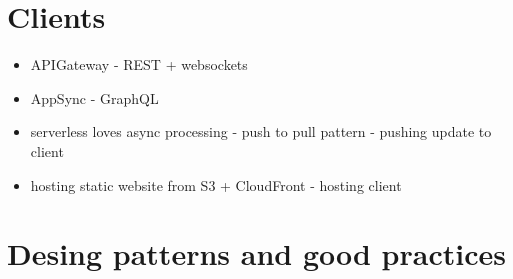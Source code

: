 \section{Clients}

\begin{itemize}
    \item APIGateway - REST + websockets
    \item AppSync - GraphQL
    \item serverless loves async processing - push to pull pattern - pushing update to client
    \item hosting static website from S3 + CloudFront - hosting client
\end{itemize}

\section{Desing patterns and good practices}